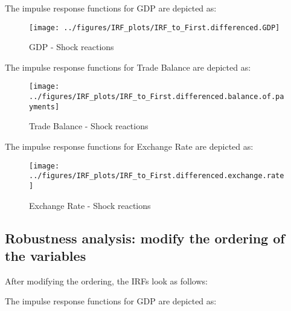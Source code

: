\documentclass[
]{article}
\begin{document}
The impulse response functions for GDP are depicted as:

\begin{figure}

{\centering \texttt{[image: ../figures/IRF\_plots/IRF\_to\_First.differenced.GDP]} 

}

\caption{GDP - Shock reactions}\label{fig:unnamed-chunk-24}
\end{figure}

The impulse response functions for Trade Balance are depicted as:

\begin{figure}

{\centering \texttt{[image: ../figures/IRF\_plots/IRF\_to\_First.differenced.balance.of.payments]} 

}

\caption{Trade Balance - Shock reactions}\label{fig:unnamed-chunk-25}
\end{figure}

The impulse response functions for Exchange Rate are depicted as:

\begin{figure}

{\centering \texttt{[image: ../figures/IRF\_plots/IRF\_to\_First.differenced.exchange.rate]} 

}

\caption{Exchange Rate - Shock reactions}\label{fig:unnamed-chunk-26}
\end{figure}

\subsection{Robustness analysis: modify the ordering of the variables}

After modifying the ordering, the IRFs look as follows:

The impulse response functions for GDP are depicted as:





\end{document}
